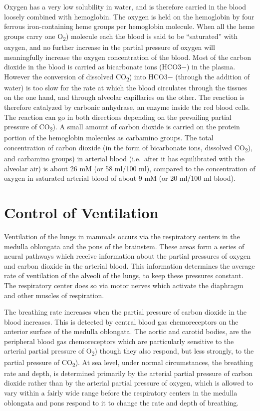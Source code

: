 Oxygen has a very low solubility in water, and is therefore carried in the blood loosely combined with hemoglobin. The oxygen is held on the hemoglobin by four ferrous iron-containing heme groups per hemoglobin molecule. When all the heme groups carry one O\textsubscript{2}) molecule each the blood is said to be ``saturated'' with oxygen, and no further increase in the partial pressure of oxygen will meaningfully increase the oxygen concentration of the blood. Most of the carbon dioxide in the blood is carried as bicarbonate ions (HCO3−) in the plasma. However the conversion of dissolved CO\textsubscript{2}) into HCO3− (through the addition of water) is too slow for the rate at which the blood circulates through the tissues on the one hand, and through alveolar capillaries on the other. The reaction is therefore catalyzed by carbonic anhydrase, an enzyme inside the red blood cells. The reaction can go in both directions depending on the prevailing partial pressure of CO\textsubscript{2}). A small amount of carbon dioxide is carried on the protein portion of the hemoglobin molecules as carbamino groups. The total concentration of carbon dioxide (in the form of bicarbonate ions, dissolved CO\textsubscript{2}), and carbamino groups) in arterial blood (i.e.~after it has equilibrated with the alveolar air) is about 26 mM (or 58 ml/100 ml), compared to the concentration of oxygen in saturated arterial blood of about 9 mM (or 20 ml/100 ml blood).

\hypertarget{control-of-ventilation}{%
\section{Control of Ventilation}\label{control-of-ventilation}}

Ventilation of the lungs in mammals occurs via the respiratory centers in the medulla oblongata and the pons of the brainstem. These areas form a series of neural pathways which receive information about the partial pressures of oxygen and carbon dioxide in the arterial blood. This information determines the average rate of ventilation of the alveoli of the lungs, to keep these pressures constant. The respiratory center does so via motor nerves which activate the diaphragm and other muscles of respiration.

The breathing rate increases when the partial pressure of carbon dioxide in the blood increases. This is detected by central blood gas chemoreceptors on the anterior surface of the medulla oblongata. The aortic and carotid bodies, are the peripheral blood gas chemoreceptors which are particularly sensitive to the arterial partial pressure of O\textsubscript{2}) though they also respond, but less strongly, to the partial pressure of CO\textsubscript{2}). At sea level, under normal circumstances, the breathing rate and depth, is determined primarily by the arterial partial pressure of carbon dioxide rather than by the arterial partial pressure of oxygen, which is allowed to vary within a fairly wide range before the respiratory centers in the medulla oblongata and pons respond to it to change the rate and depth of breathing.

